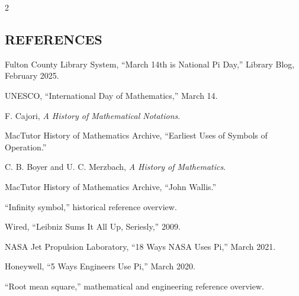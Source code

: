 \begin{multicols}{2}
  \subsection*{\centering\uppercase{References}}
  {\footnotesize
  \begin{justify}
    \begin{enumerate}[label={\relax[\arabic*]},leftmargin=*,labelsep=0.5em,itemsep=0pt,parsep=0pt]
      \item Fulton County Library System, “March 14th is National Pi Day,” Library Blog, February 2025.
      \item UNESCO, “International Day of Mathematics,” March 14.
      \item F. Cajori, \textit{A History of Mathematical Notations}.
      \item MacTutor History of Mathematics Archive, “Earliest Uses of Symbols of Operation.”
      \item C. B. Boyer and U. C. Merzbach, \textit{A History of Mathematics}.
      \item MacTutor History of Mathematics Archive, “John Wallis.”
      \item “Infinity symbol,” historical reference overview.
      \item Wired, “Leibniz Sums It All Up, Seriesly,” 2009.
      \item NASA Jet Propulsion Laboratory, “18 Ways NASA Uses Pi,” March 2021.
      \item Honeywell, “5 Ways Engineers Use Pi,” March 2020.
      \item “Root mean square,” mathematical and engineering reference overview.
    \end{enumerate}
  \end{justify}}

\end{multicols}
